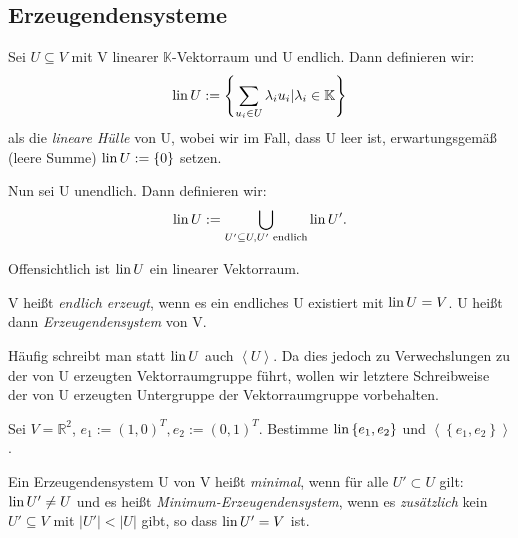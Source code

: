\documentclass[10pt]{scrbook}
\begin{document}
\subsection{Erzeugendensysteme}

\begin{Def}
Sei $U\subseteq V$ mit V linearer $\mathbb{K}$-Vektorraum und U endlich. Dann definieren wir:
\begin{displaymath}
	\operatorname{lin} U:=\left\{\sum\limits_{u_i\in U}{\lambda_i u_i}|\lambda_i\in \mathbb{K}\right\}
\end{displaymath}
als die \emph{lineare Hülle} von U, wobei wir im Fall, dass U leer ist, erwartungsgemäß (leere Summe) $\operatorname{lin} U:=\left\{0\right\}$ setzen.
\end{Def}

\begin{Def}
Nun sei U unendlich. Dann definieren wir:
\begin{displaymath}
	\operatorname{lin} U:=\bigcup\limits_{U'\subseteq U, U'\textnormal{ endlich}}{\operatorname{lin} U'}.
\end{displaymath}
\end{Def}

\begin{Bem}
Offensichtlich ist $\operatorname{lin} U$ ein linearer Vektorraum.
\end{Bem}

\begin{Def}
V heißt \emph{endlich erzeugt}, wenn es ein endliches U existiert mit $\operatorname{lin} U=V$. U heißt dann \emph{Erzeugendensystem} von V.
\end{Def}

\begin{Bem}
Häufig schreibt man statt $\operatorname{lin} U$ auch $\left\langle U\right\rangle$. Da dies jedoch zu Verwechslungen zu der von U erzeugten Vektorraumgruppe führt, wollen wir letztere Schreibweise der von U erzeugten Untergruppe der Vektorraumgruppe vorbehalten.
\end{Bem}

\begin{Auf}
Sei $V=\mathbb{R}^2$, $e_1:=(1, 0)^T, e_2:=(0, 1)^T$. Bestimme $\operatorname{lin}\left\{e_1, e_2\right\}$ und $\left\langle \left\{e_1, e_2\right\}\right\rangle$.
\end{Auf}

\begin{Def}
Ein Erzeugendensystem U von V heißt \emph{minimal}, wenn für alle $U'\subset U$ gilt: $\operatorname{lin} U'\neq U$ und es heißt \emph{Minimum-Erzeugendensystem}, wenn es \emph{zusätzlich} kein $U'\subseteq V$ mit $\left|U'\right|<\left|U\right|$ gibt, so dass $\operatorname{lin} U'=V$ ist.
\end{Def}
\end{document}
